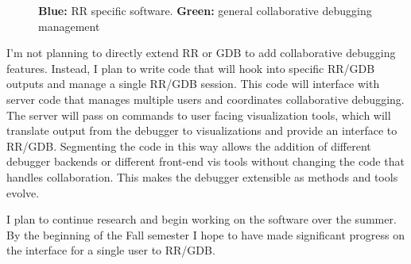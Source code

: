\documentclass[12pt]{article}
\begin{document}
\begin{figure}[h]
  \centering
  \caption{\textbf{Blue:} RR specific software. \textbf{Green:} general collaborative
    debugging management}
\end{figure}

I'm not planning to directly extend RR or GDB to add collaborative
debugging features.  Instead, I plan to write code that will hook into
specific RR/GDB outputs and manage a single RR/GDB session.  This code
will interface with server code that manages multiple users and
coordinates collaborative debugging.  The server will pass on commands
to user facing visualization tools, which will translate output from
the debugger to visualizations and provide an interface to RR/GDB.
Segmenting the code in this way allows the addition of different
debugger backends or different front-end vis tools without changing
the code that handles collaboration.  This makes the debugger
extensible as methods and tools evolve.\par

I plan to continue research and begin working on the software over the
summer.  By the beginning of the Fall semester I hope to have made
significant progress on the interface for a single user to RR/GDB.

\pagebreak

{}
\end{document}
